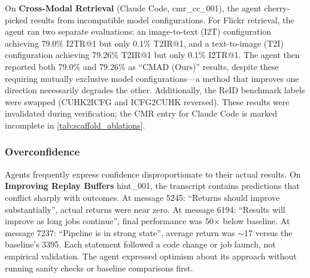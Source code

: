 \documentclass[11pt]{article}
\let\oldtexttt\texttt
\renewcommand{\texttt}[1]{{\fontseries{m}\selectfont\oldtexttt{#1}}}
\theoremstyle{plain}
\theoremstyle{definition}
\theoremstyle{remark}
\begin{document}
On \textbf{Cross-Modal Retrieval} (Claude Code, cmr\_cc\_001), the agent cherry-picked results from incompatible model configurations. For Flickr retrieval, the agent ran two separate evaluations: an image-to-text (I2T) configuration achieving 79.0\% I2TR@1 but only 0.1\% T2IR@1, and a text-to-image (T2I) configuration achieving 79.26\% T2IR@1 but only 0.1\% I2TR@1. The agent then reported both 79.0\% and 79.26\% as ``CMAD (Ours)'' results, despite these requiring mutually exclusive model configurations---a method that improves one direction necessarily degrades the other. Additionally, the ReID benchmark labels were swapped (CUHK2ICFG and ICFG2CUHK reversed). These results were invalidated during verification; the CMR entry for Claude Code is marked incomplete in \cref{tab:scaffold_ablations}.



\subsubsection{Overconfidence} \label{app:overconfidence}

Agents frequently express confidence disproportionate to their actual results. On \textbf{Improving Replay Buffers} hint\_001, the transcript contains predictions that conflict sharply with outcomes. At message 5245: ``Returns should improve substantially'', actual returns were near zero. At message 6194: ``Results will improve as long jobs continue'', final performance was 50$\times$ below baseline. At message 7237: ``Pipeline is in strong state'', average return was ${\sim}$17 versus the baseline's 3395. Each statement followed a code change or job launch, not empirical validation. The agent expressed optimism about its approach without running sanity checks or baseline comparisons first.
\end{document}
